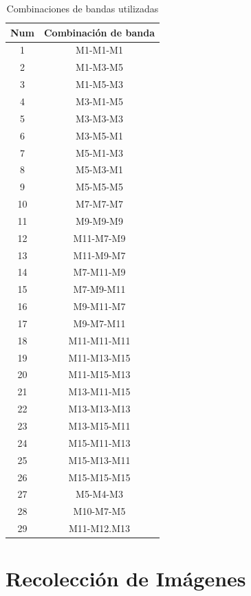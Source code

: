 \begin{table}[H] \begin{center}
\begin{tabular}{c|c}
Num & Combinación de banda\\ \hline 
1  	& 	M1-M1-M1 	\\ \hline
2  	&   M1-M3-M5	\\  \hline
3  	& 	M1-M5-M3	\\ \hline
4  	&   M3-M1-M5 	\\ \hline
5   & 	M3-M3-M3 	\\ \hline
6   & 	M3-M5-M1 	\\ \hline
7   & 	M5-M1-M3 	\\ \hline
8   & 	M5-M3-M1 	\\ \hline
9   &   M5-M5-M5  	\\ \hline
10  &	M7-M7-M7   	\\ \hline
11  & 	M9-M9-M9   	\\ \hline
12  & 	M11-M7-M9  	\\ \hline
13  & 	M11-M9-M7  	\\ \hline
14  &  	M7-M11-M9  	\\ \hline
15  & 	M7-M9-M11  	\\ \hline
16  & 	M9-M11-M7  	\\ \hline
17  & 	M9-M7-M11  	\\ \hline
18  & 	M11-M11-M11	\\ \hline
19  & 	M11-M13-M15 \\ \hline
20  & 	M11-M15-M13 \\ \hline
21  & 	M13-M11-M15 \\ \hline
22  & 	M13-M13-M13	\\ \hline
23  & 	M13-M15-M11 \\ \hline
24  & 	M15-M11-M13	\\ \hline
25  & 	M15-M13-M11	\\ \hline
26  & 	M15-M15-M15 \\ \hline
27  & 	M5-M4-M3 	\\ \hline
28  & 	M10-M7-M5 	\\ \hline   
29  & 	M11-M12.M13	\\ \hline        	
\end{tabular}
\end{center}\caption{Combinaciones de bandas utilizadas \label{tab:combinacion_banda}}
\end{table}
\section{Recolección de Imágenes}\label{sub:recolecciondeimagen}

